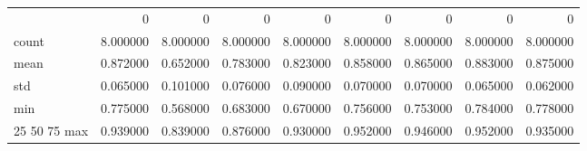 \begin{tabular}{lrrrrrrrr}
 & 0 & 0 & 0 & 0 & 0 & 0 & 0 & 0 \\
count & 8.000000 & 8.000000 & 8.000000 & 8.000000 & 8.000000 & 8.000000 & 8.000000 & 8.000000 \\
mean & 0.872000 & 0.652000 & 0.783000 & 0.823000 & 0.858000 & 0.865000 & 0.883000 & 0.875000 \\
std & 0.065000 & 0.101000 & 0.076000 & 0.090000 & 0.070000 & 0.070000 & 0.065000 & 0.062000 \\
min & 0.775000 & 0.568000 & 0.683000 & 0.670000 & 0.756000 & 0.753000 & 0.784000 & 0.778000 \\
25%
50%
75%
max & 0.939000 & 0.839000 & 0.876000 & 0.930000 & 0.952000 & 0.946000 & 0.952000 & 0.935000 \\
\end{tabular}

